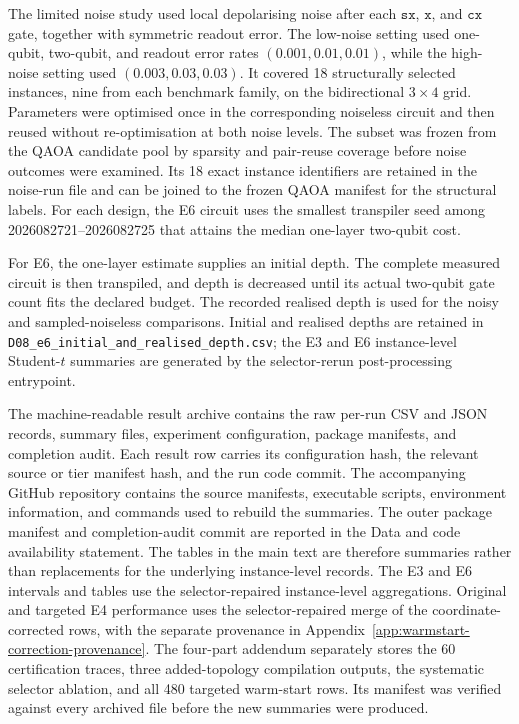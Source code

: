 \documentclass[a4paper,onecolumn,11pt,unpublished]{quantumarticle}
\theoremstyle{remark}
\begin{document}
\label{app:noise-protocol}
The limited noise study used local depolarising noise after each
$\mathtt{sx}$, $\mathtt{x}$, and $\mathtt{cx}$ gate, together with symmetric
readout error.  The low-noise setting used one-qubit, two-qubit, and readout
error rates $(0.001,0.01,0.01)$, while the high-noise setting used
$(0.003,0.03,0.03)$.  It covered 18 structurally selected instances, nine from
each benchmark family, on the bidirectional $3\times4$ grid.  Parameters were
optimised once in the corresponding noiseless circuit and then reused without
re-optimisation at both noise levels.  The subset was frozen from the QAOA
candidate pool by sparsity and pair-reuse coverage before noise outcomes were
examined.  Its 18 exact instance identifiers are retained in the noise-run
file and can be joined to the frozen QAOA manifest for the
structural labels.  For each design, the E6 circuit
uses the smallest transpiler seed among 2026082721--2026082725 that attains the
median one-layer two-qubit cost.

For E6, the one-layer estimate supplies an initial depth. The complete
measured circuit is then transpiled, and depth is decreased until its actual
two-qubit gate count fits the declared budget. The recorded realised depth
is used for the noisy and sampled-noiseless comparisons. Initial and realised
depths are retained in \nolinkurl{D08_e6_initial_and_realised_depth.csv};
the E3 and E6 instance-level Student-$t$ summaries are generated by the
selector-rerun post-processing entrypoint.


The machine-readable result archive contains the raw per-run CSV and JSON
records, summary files, experiment configuration, package manifests, and
completion audit.  Each result row carries its configuration hash, the relevant
source or tier manifest hash, and the run code commit.  The accompanying GitHub
repository contains the source manifests, executable scripts, environment
information, and commands used to rebuild the summaries.  The outer package
manifest and completion-audit commit are reported in the Data and code
availability statement. The tables in the main text are therefore summaries
rather than replacements for the underlying instance-level records. The E3
and E6 intervals and tables use the selector-repaired instance-level
aggregations. Original and targeted E4 performance uses the selector-repaired
merge of the coordinate-corrected rows,
with the separate provenance in
Appendix~\ref{app:warmstart-correction-provenance}. The four-part addendum separately stores the 60
certification traces, three added-topology compilation outputs, the systematic
selector ablation, and all 480 targeted warm-start rows.  Its manifest was
verified against every archived file before the new summaries were produced.
\end{document}
